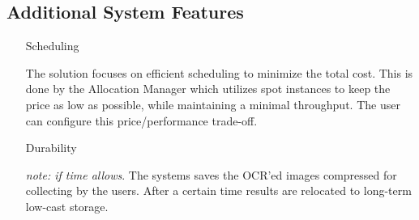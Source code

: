 \documentclass[10pt]{article}
\begin{document}
\subsection*{Additional System Features}

\begin{itemize}

\item[Scheduling]

The solution focuses on efficient scheduling to minimize the total cost. This is done by the Allocation Manager which utilizes spot instances to keep the price as low as possible, while maintaining a minimal throughput. The user can configure this price/performance trade-off.

\item[Durability]

\emph{note: if time allows}. The systems saves the OCR'ed images compressed for collecting by the users. After a certain time results are relocated to long-term low-cast storage.

\end{itemize}
\end{document}
